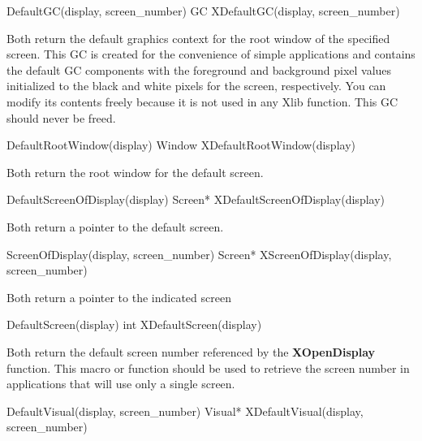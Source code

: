 \documentclass{report}
\begin{document}
\begin{itemize}
\begin{center}
            \end{center}
            \bigbreak \noindent 
            \begin{cppcode}
            DefaultGC(display, screen_number)
            GC XDefaultGC(display, screen_number)
            \end{cppcode}
            \bigbreak \noindent 
            Both return the default graphics context for the root window of the specified screen. This GC is created for the convenience of simple applications and contains the default GC components with the foreground and background pixel values initialized to the black and white pixels for the screen, respectively. You can modify its contents freely because it is not used in any Xlib function. This GC should never be freed.
            \bigbreak \noindent 
            \begin{cppcode}
            DefaultRootWindow(display)
            Window XDefaultRootWindow(display)
            \end{cppcode}
            \bigbreak \noindent 
            Both return the root window for the default screen.
            \bigbreak \noindent 
            \begin{cppcode}
            DefaultScreenOfDisplay(display)
            Screen* XDefaultScreenOfDisplay(display)
            \end{cppcode}
            \bigbreak \noindent 
            Both return a pointer to the default screen.
            \bigbreak \noindent 
            \begin{cppcode}
            ScreenOfDisplay(display, screen_number)
            Screen* XScreenOfDisplay(display, screen_number)
            \end{cppcode}
            \bigbreak \noindent 
            Both return a pointer to the indicated screen
            \bigbreak \noindent 
            \begin{cppcode}
            DefaultScreen(display)
            int XDefaultScreen(display)
            \end{cppcode}
            \bigbreak \noindent 
            Both return the default screen number referenced by the \textbf{XOpenDisplay} function. This macro or function should be used to retrieve the screen number in applications that will use only a single screen.
            \bigbreak \noindent 
            \begin{cppcode}
            DefaultVisual(display, screen_number)
            Visual* XDefaultVisual(display, screen_number)
            \end{cppcode}

\end{itemize}
\end{document}
